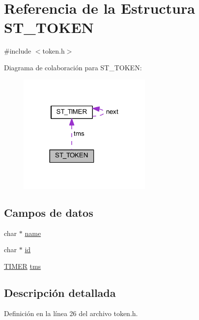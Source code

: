 \hypertarget{struct_s_t___t_o_k_e_n}{}\section{Referencia de la Estructura S\+T\+\_\+\+T\+O\+K\+E\+N}
\label{struct_s_t___t_o_k_e_n}


{\ttfamily \#include $<$token.\+h$>$}



Diagrama de colaboración para S\+T\+\_\+\+T\+O\+K\+E\+N\+:\nopagebreak
\begin{figure}[H]
\begin{center}
\leavevmode
\includegraphics[width=185pt]{struct_s_t___t_o_k_e_n__coll__graph}
\end{center}
\end{figure}
\subsection*{Campos de datos}
\begin{DoxyCompactItemize}
\item 
char $\ast$ \hyperlink{struct_s_t___t_o_k_e_n_a5ac083a645d964373f022d03df4849c8}{name}
\item 
char $\ast$ \hyperlink{struct_s_t___t_o_k_e_n_aecb3b0d045ada529257a2fbf8f829599}{id}
\item 
\hyperlink{sdp_types_8h_a94c0315eea22344f1e853cc7c90592bb}{T\+I\+M\+E\+R} \hyperlink{struct_s_t___t_o_k_e_n_a7427db66ac10c39267f1981f54f0a91f}{tms}
\end{DoxyCompactItemize}


\subsection{Descripción detallada}


Definición en la línea 26 del archivo token.\+h.




